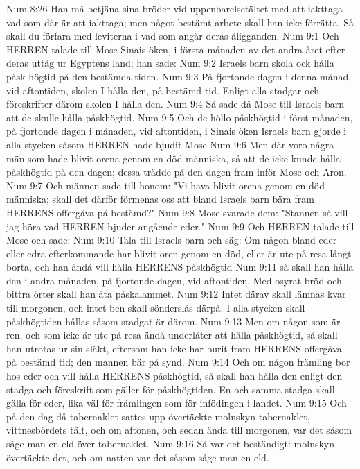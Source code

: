 Num 8:26  Han må betjäna sina bröder vid uppenbarelsetältet med att iakttaga vad som där är att iakttaga; men något bestämt arbete skall han icke förrätta. Så skall du förfara med leviterna i vad som angår deras åligganden.
Num 9:1  Och HERREN talade till Mose Sinais öken, i första månaden av det andra året efter deras uttåg ur Egyptens land; han sade:
Num 9:2  Israels barn skola ock hålla påsk högtid på den bestämda tiden.
Num 9:3  På fjortonde dagen i denna månad, vid aftontiden, skolen I hålla den, på bestämd tid. Enligt alla stadgar och föreskrifter därom skolen I hålla den.
Num 9:4  Så sade då Mose till Israels barn att de skulle hålla påskhögtid.
Num 9:5  Och de höllo påskhögtid i först månaden, på fjortonde dagen i månaden, vid aftontiden, i Sinais öken Israels barn gjorde i alla stycken såsom HERREN hade bjudit Mose
Num 9:6  Men där voro några män som hade blivit orena genom en död människa, så att de icke kunde hålla påskhögtid på den dagen; dessa trädde på den dagen fram inför Mose och Aron.
Num 9:7  Och männen sade till honom: "Vi hava blivit orena genom en död människa; skall det därför förmenas oss att bland Israels barn bära fram HERRENS offergåva på bestämd?"
Num 9:8  Mose svarade dem: "Stannen så vill jag höra vad HERREN bjuder angående eder."
Num 9:9  Och HERREN talade till Mose och sade:
Num 9:10  Tala till Israels barn och säg: Om någon bland eder eller edra efterkommande har blivit oren genom en död, eller är ute på resa långt borta, och han ändå vill hålla HERRENS påskhögtid
Num 9:11  så skall han hålla den i andra månaden, på fjortonde dagen, vid aftontiden. Med osyrat bröd och bittra örter skall han äta påskalammet.
Num 9:12  Intet därav skall lämnas kvar till morgonen, och intet ben skall sönderslås därpå. I alla stycken skall påskhögtiden hållas såsom stadgat är därom.
Num 9:13  Men om någon som är ren, och som icke är ute på resa ändå underlåter att hålla påskhögtid, så skall han utrotas ur sin släkt, eftersom han icke har burit fram HERRENS offergåva på bestämd tid; den mannen bär på synd.
Num 9:14  Och om någon främling bor hos eder och vill hålla HERRENS påskhögtid, så skall han hålla den enligt den stadga och föreskrift som gäller för påskhögtiden. En och samma stadga skall gälla för eder, lika väl för främlingen som för infödingen i landet.
Num 9:15  Och på den dag då tabernaklet sattes upp övertäckte molnskyn tabernaklet, vittnesbördets tält, och om aftonen, och sedan ända till morgonen, var det såsom såge man en eld över tabernaklet.
Num 9:16  Så var det beständigt: molnskyn övertäckte det, och om natten var det såsom såge man en eld.
